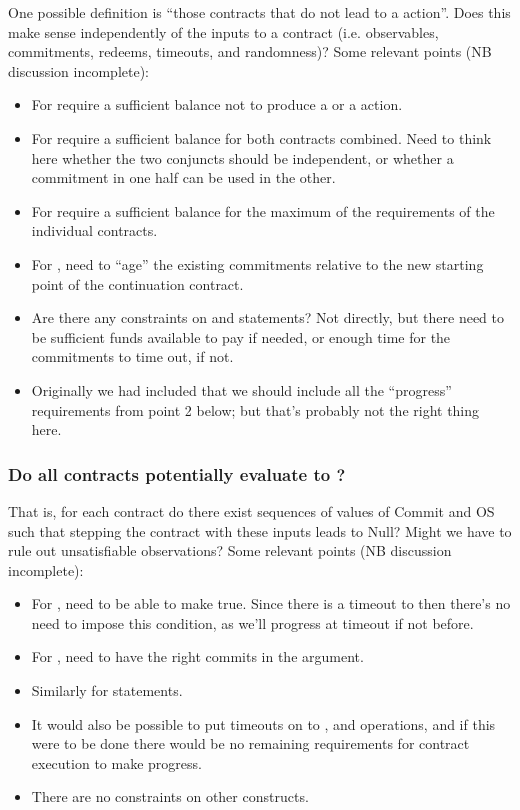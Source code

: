 \documentclass[
      acmsmall
    , screen
    , review=true
  ]{acmart}
\begin{document}
One possible definition is ``those contracts that do not lead to a  action''. Does this make sense independently of the inputs to a contract (i.e. observables, commitments, redeems, timeouts, and randomness)?
Some relevant points (NB discussion incomplete):
\begin{itemize}
\item For  require a sufficient balance not to produce a  or a  action. 
\item For  require a sufficient balance for both contracts combined. Need to think here whether the two conjuncts should be independent, or whether a commitment in one half can be used in the other.
\item For  require a sufficient balance for the maximum of the requirements of the individual contracts. 
\item For , need to ``age'' the existing commitments relative to the new starting point of the continuation contract. 
\item Are there any constraints on   and  statements? Not directly, but there need to be sufficient funds available to pay if needed, or enough time for the commitments to time out, if not.
\item Originally we had included that we should include all the ``progress'' requirements from point 2 below; but that's probably not the right thing here.

\end{itemize}

\subsubsection{Do all contracts potentially evaluate to ?}

That is, for each contract do there exist sequences of values of Commit and OS such that stepping the contract with these inputs leads to Null? Might we have to rule out unsatisfiable observations?
Some relevant points (NB discussion incomplete):
\begin{itemize}
\item For , need to be able to make  true. Since there is a timeout to  then there's no need to impose this condition, as we'll progress at timeout if not before.
\item For , need to have the right commits in the  argument.
\item Similarly for  statements.
\item It would also be possible to put timeouts on to ,  and  operations, and if this were to be done there would be no remaining requirements for contract execution to make progress.
\item There are no constraints on other constructs.
\end{itemize}
\end{document}
